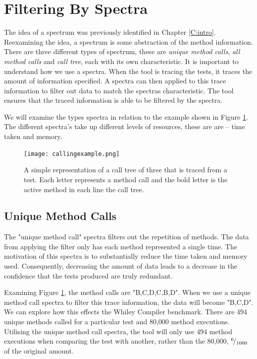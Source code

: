 \section{Filtering By Spectra}
\label{S:spectra}
The idea of a spectrum was previously identified in Chapter \ref{C:intro}. Reexamining the idea, a spectrum is some abstraction of the method information. There are three different types of spectrum, these are \textit{unique method calls}, \textit{all method calls} and \textit{call tree}, each with its own characteristic. It is important to understand how we use a spectra. When the tool is tracing the tests, it traces the amount of information specified. A spectra can then applied to this trace information to filter out data to match the spectras characteristic. The tool ensures that the traced information is able to be filtered by the spectra. 

We will examine the types spectra in relation to the example shown in Figure \ref{fig:callingexample}. The different spectra's take up different levels of resources, these are are -- time taken and memory. 


\begin{figure}[h]
\begin{center}
\texttt{[image: callingexample.png]}
\end{center}
\caption{A simple representation of a call tree of three that is traced from a test. Each letter represents a method call and the bold letter is the active method in each line the call tree.}
\label{fig:callingexample}
\end{figure}

\subsection{Unique Method Calls}
The "unique method call" spectra filters out the repetition of methods. The data from applying the filter only has each method represented a single time. The motivation of this spectra is to substantially reduce the time taken and memory used. Consequently, decreasing the amount of data leads to a decrease in the confidence that the tests produced are truly redundant. 

Examining Figure \ref{fig:callingexample}, the method calls are "B,C,D,C,B,D". When we use a unique method call spectra to filter this trace information, the data will become "B,C,D". We can explore how this effects the Whiley Compiler benchmark. There are 494 unique methods called for a particular test and 80,000 method executions. Utilising the unique method call spectra, the tool will only use 494 method executions when comparing the test with another, rather than the 80,000, ${}^{6}\!/_{1000}$ of the original amount. 

